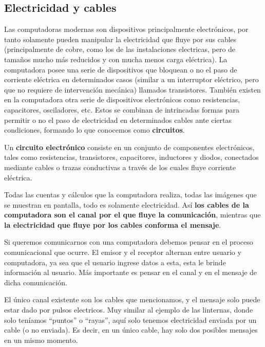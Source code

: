 \subsection{Electricidad y cables}

Las computadoras modernas son dispositivos principalmente electrónicos, por tanto
solamente pueden manipular la electricidad que fluye por sus cables (principalmente de
cobre, como los de las instalaciones electricas, pero de tamaños mucho más
reducidos y con mucha menos carga eléctrica). La computadora posee una serie de
dispositivos que bloquean o no el paso de corriente eléctrica en determinados
casos (similar a un interruptor eléctrico, pero que no requiere de intervención
mecánica) llamados transistores. También existen en la computadora otra serie de 
dispositivos electrónicos como resistencias, capacitores, osciladores, etc.
Estos se combinan de intrincadas formas para permitir o no el paso de electricidad
en determinados cables ante ciertas condiciones, formando lo que conocemos como
\textbf{circuitos}.

\begin{definition}
    Un \textbf{circuito electrónico} consiste en un conjunto de componentes
    electrónicos, tales como resistencias, transistores, capacitores, inductores
    y diodos, conectados mediante cables o trazas conductivas a través de los
    cuales fluye corriente eléctrica.
\end{definition}

Todas las cuentas y cálculos que la computadora realiza, todas las imágenes que
se muestran en pantalla, todo es solamente electricidad. Así \textbf{los cables
de la computadora son el canal por el que fluye la comunicación}, mientras que
\textbf{la electricidad que fluye por los cables conforma el mensaje}.

Si queremos comunicarnos con una computadora debemos pensar en el proceso
comunicacional que ocurre. El emisor y el receptor alternan entre usuario y
computadora, ya sea que el usuario ingrese datos a esta, esta le brinde
información al usuario. Más importante es pensar en el canal y en el mensaje de
dicha comunicación.

El único canal existente son los cables que mencionamos, y el mensaje solo puede
estar dado por pulsos electricos. Muy similar al ejemplo de las linternas, donde
solo teníamos ``puntos'' o ``rayas'', aquí solo tenemos electricidad enviada por
un cable (o no enviada). Es decir, en un único cable, hay solo dos posibles
mensajes en un mismo momento.

